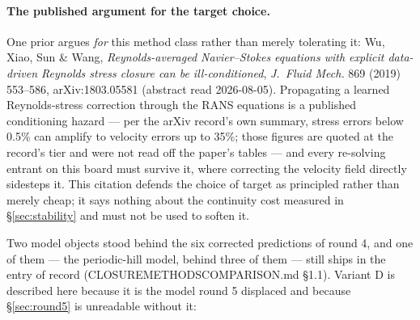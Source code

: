 \documentclass[11pt,a4paper]{article}
\newcommand{\breakus}{\textunderscore\allowbreak}
\newcommand{\artifact}[1]{{\footnotesize\ttfamily\let\_\breakus #1}}
\begin{document}
\paragraph{The published argument for the target choice.} One prior argues \emph{for}
this method class rather than merely tolerating it: Wu, Xiao, Sun \& Wang,
\emph{Reynolds-averaged Navier--Stokes equations with explicit data-driven Reynolds
stress closure can be ill-conditioned}, \emph{J.\ Fluid Mech.} 869 (2019) 553--586,
arXiv:1803.05581 (abstract read 2026-08-05). Propagating a learned Reynolds-stress
correction through the RANS equations is a published conditioning hazard --- per the
arXiv record's own summary, stress errors below 0.5\% can amplify to velocity errors up
to 35\%; those figures are quoted at the record's tier and were not read off the paper's
tables --- and every re-solving entrant on this board must survive it, where correcting
the velocity field directly sidesteps it. This citation defends the choice of target as
principled rather than merely cheap; it says nothing about the continuity cost measured
in \S\ref{sec:stability} and must not be used to soften it.

Two model objects stood behind the six corrected predictions of round 4, and one of them
--- the periodic-hill model, behind three of them --- still ships in the entry of record
(\artifact{CLOSURE\_METHODS\_COMPARISON.md} \S1.1). Variant D is described here because it
is the model round 5 displaced and because \S\ref{sec:round5} is unreadable without it:
\end{document}
